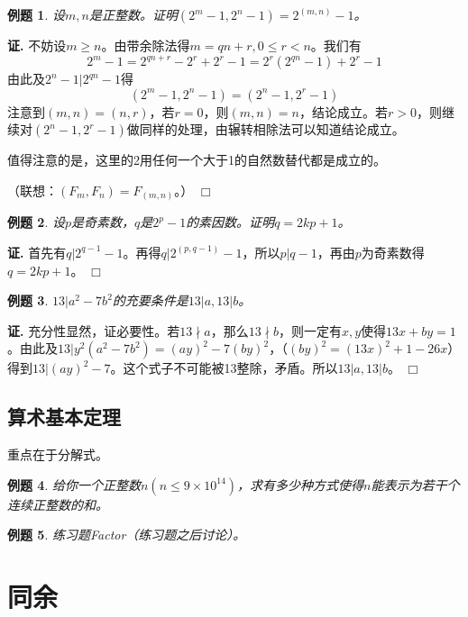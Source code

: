 \documentclass{ctexart}
\newtheorem{exmp}{例题}[section]
\renewenvironment{proof}[1][证]{\noindent \textbf{#1.} }{\hfill$\Box$}
\begin{document}
\begin{exmp}
设$m, n$是正整数。证明$(2^m-1,2^n-1)=2^{(m,n)}-1$。
\end{exmp}
\begin{proof}
不妨设$m \geq n$。由带余除法得$m=qn+r, 0 \leq r < n$。我们有
\begin{displaymath}
2^m-1=2^{qn+r}-2^r+2^r-1=2^r(2^{qn}-1)+2^r-1
\end{displaymath}
由此及$2^n-1|2^{qn}-1$得
\begin{displaymath}
(2^m-1,2^n-1)=(2^n-1,2^r-1)
\end{displaymath}
注意到$(m,n)=(n,r)$，若$r=0$，则$(m,n)=n$，结论成立。若$r>0$，则继续对$(2^n-1,2^r-1)$做同样的处理，由辗转相除法可以知道结论成立。

值得注意的是，这里的2用任何一个大于1的自然数替代都是成立的。

（联想：$(F_m,F_n)=F_{(m,n)}$。）
\end{proof}

\begin{exmp}
设$p$是奇素数，$q$是$2^p-1$的素因数。证明$q=2kp+1$。
\end{exmp}
\begin{proof}
首先有$q|2^{q-1}-1$。再得$q|2^{(p,q-1)}-1$，所以$p|q-1$，再由$p$为奇素数得$q=2kp+1$。
\end{proof}

\begin{exmp}
$13|a^2-7b^2$的充要条件是$13|a, 13|b$。
\end{exmp}
\begin{proof}
充分性显然，证必要性。若$13\nmid a$，那么$13\nmid b$，则一定有$x, y$使得$13x+by=1$。由此及$13|y^2(a^2-7b^2)=(ay)^2-7(by)^2$，（$(by)^2=(13x)^2+1-26x$）得到$13|(ay)^2-7$。这个式子不可能被13整除，矛盾。所以$13|a, 13|b$。
\end{proof}


\subsection{算术基本定理}
重点在于分解式。

\begin{exmp}
给你一个正整数$n(n \leq 9\times 10^{14})$，求有多少种方式使得$n$能表示为若干个连续正整数的和。
\end{exmp}

\begin{exmp}
练习题Factor（练习题之后讨论）。
\end{exmp}


\section{同余}
\end{document}
